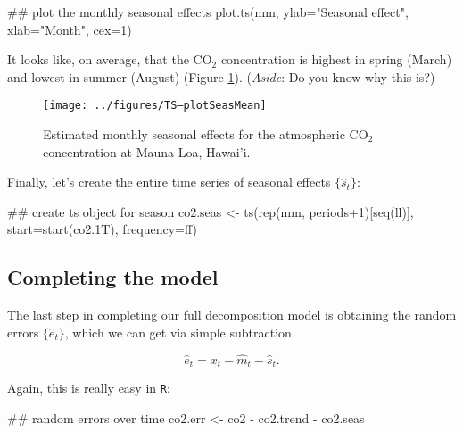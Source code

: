 \begin{Schunk}
\begin{Sinput}
 ## plot the monthly seasonal effects
 plot.ts(mm, ylab="Seasonal effect", xlab="Month", cex=1)
\end{Sinput}
\end{Schunk}

\noindent It looks like, on average, that the CO$_2$ concentration is highest in spring (March) and lowest in summer (August) (Figure \ref{fig:LW1.fig3}).  (\emph{Aside}: Do you know why this is?)

\begin{figure}[htp]
\begin{center}
\texttt{[image: ../figures/TS--plotSeasMean]}
\end{center}
\caption{Estimated monthly seasonal effects for the atmospheric CO$_2$ concentration at Mauna Loa, Hawai'i.}
\label{fig:LW1.fig3}
\end{figure}

Finally, let's create the entire time series of seasonal effects $\{\hat{s}_t\}$:

\begin{Schunk}
\begin{Sinput}
 ## create ts object for season
 co2.seas <- ts(rep(mm, periods+1)[seq(ll)],
                start=start(co2.1T), 
                frequency=ff)
\end{Sinput}
\end{Schunk}

\subsection{Completing the model}

The last step in completing our full decomposition model is obtaining the random errors $\{\hat{e}_t\}$, which we can get via simple subtraction

\begin{equation}\label{eqn:errorEst}
\hat{e}_t = x_t - \hat{m}_t - \hat{s}_t.
\end{equation}

\noindent Again, this is really easy in \texttt{R}:

\begin{Schunk}
\begin{Sinput}
 ## random errors over time
 co2.err <- co2 - co2.trend - co2.seas
\end{Sinput}
\end{Schunk}
  
